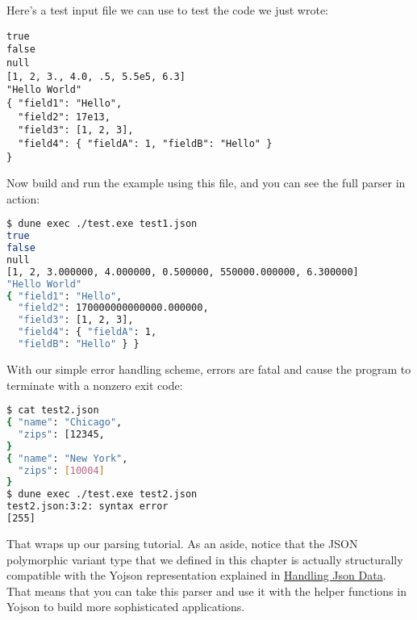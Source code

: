 Here's a test input file we can use to test the code we just wrote:

\begin{lstlisting}
true
false
null
[1, 2, 3., 4.0, .5, 5.5e5, 6.3]
"Hello World"
{ "field1": "Hello",
  "field2": 17e13,
  "field3": [1, 2, 3],
  "field4": { "fieldA": 1, "fieldB": "Hello" }
}
\end{lstlisting}

Now build and run the example using this file, and you can see the full
parser in action:

\begin{lstlisting}[language=bash]
$ dune exec ./test.exe test1.json
true
false
null
[1, 2, 3.000000, 4.000000, 0.500000, 550000.000000, 6.300000]
"Hello World"
{ "field1": "Hello",
  "field2": 170000000000000.000000,
  "field3": [1, 2, 3],
  "field4": { "fieldA": 1,
  "fieldB": "Hello" } }
\end{lstlisting}

With our simple error handling scheme, errors are fatal and cause the
program to terminate with a nonzero exit code:

\begin{lstlisting}[language=bash]
$ cat test2.json
{ "name": "Chicago",
  "zips": [12345,
}
{ "name": "New York",
  "zips": [10004]
}
$ dune exec ./test.exe test2.json
test2.json:3:2: syntax error
[255]
\end{lstlisting}

That wraps up our parsing tutorial. As an aside, notice that the JSON
polymorphic variant type that we defined in this chapter is actually
structurally compatible with the Yojson representation explained in
\href{json.html\#handling-json-data}{Handling Json Data}. That means
that you can take this parser and use it with the helper functions in
Yojson to build more sophisticated applications.
